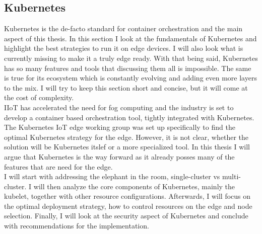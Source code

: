 \subsection{Kubernetes}
Kubernetes is the de-facto standard for container orchestration and the main aspect of this thesis. In this section I look at the fundamentals of Kubernetes and highlight the best strategies to run it on edge devices. I will also look what is currently missing to make it a truly edge ready. With that being said, Kubernetes has so many features and tools that discussing them all is impossible. The same is true for its ecosystem which is constantly evolving and adding even more layers to the mix. I will try to keep this section short and concise, but it will come at the cost of complexity.\\
IIoT has accelerated the need for fog computing and the industry is set to develop a container based orchestration tool, tightly integrated with Kubernetes. The Kubernetes IoT edge working group was set up specifically to find the optimal Kubernetes strategy for the edge. However, it is not clear, whether the solution will be Kubernetes itslef or a more specialized tool. In this thesis I will argue that Kubernetes is the way forward as it already posses many of the features that are need for the edge.\\ 
I will start with addressing the elephant in the room, single-cluster vs multi-cluster. I will then analyze the core components of Kubernetes, mainly the kubelet, together with other resource configurations. Afterwards, I will focus on the optimal deployment strategy, how to control resources on the edge and node selection. Finally, I will look at the security aspect of Kubernetes and conclude with recommendations for the implementation.

